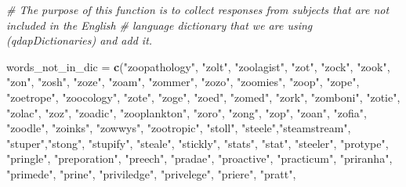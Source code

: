 \documentclass[
]{article}
\newenvironment{Shaded}{\begin{snugshade}}{\end{snugshade}}
\newcommand{\CommentTok}[1]{\textcolor[rgb]{0.56,0.35,0.01}{\textit{#1}}}
\newcommand{\FunctionTok}[1]{\textcolor[rgb]{0.13,0.29,0.53}{\textbf{#1}}}
\newcommand{\NormalTok}[1]{#1}
\newcommand{\OtherTok}[1]{\textcolor[rgb]{0.56,0.35,0.01}{#1}}
\newcommand{\StringTok}[1]{\textcolor[rgb]{0.31,0.60,0.02}{#1}}
\begin{document}
\begin{Shaded}
\begin{Highlighting}[]
\CommentTok{\# The purpose of this function is to collect responses from subjects that are not included in the English }
\CommentTok{\# language dictionary that we are using (qdapDictionaries) and add it. }

\NormalTok{words\_not\_in\_dic }\OtherTok{=} \FunctionTok{c}\NormalTok{(}\StringTok{"zoopathology"}\NormalTok{, }\StringTok{"zolt"}\NormalTok{, }\StringTok{"zoolagist"}\NormalTok{, }\StringTok{"zot"}\NormalTok{, }\StringTok{"zock"}\NormalTok{, }\StringTok{"zook"}\NormalTok{, }\StringTok{"zon"}\NormalTok{,}
                     \StringTok{"zosh"}\NormalTok{, }\StringTok{"zoze"}\NormalTok{, }\StringTok{"zoam"}\NormalTok{, }\StringTok{"zommer"}\NormalTok{, }\StringTok{"zozo"}\NormalTok{, }\StringTok{"zoomies"}\NormalTok{, }\StringTok{"zoop"}\NormalTok{, }\StringTok{"zope"}\NormalTok{,}
                     \StringTok{"zoetrope"}\NormalTok{, }\StringTok{"zoocology"}\NormalTok{, }\StringTok{"zote"}\NormalTok{, }\StringTok{"zoge"}\NormalTok{, }\StringTok{"zoed"}\NormalTok{, }\StringTok{"zomed"}\NormalTok{, }\StringTok{"zork"}\NormalTok{,}
                     \StringTok{"zomboni"}\NormalTok{, }\StringTok{"zotie"}\NormalTok{, }\StringTok{"zolac"}\NormalTok{, }\StringTok{"zoz"}\NormalTok{, }\StringTok{"zoadic"}\NormalTok{, }\StringTok{"zooplankton"}\NormalTok{, }\StringTok{"zoro"}\NormalTok{,}
                     \StringTok{"zong"}\NormalTok{, }\StringTok{"zop"}\NormalTok{, }\StringTok{"zoan"}\NormalTok{, }\StringTok{"zofia"}\NormalTok{, }\StringTok{"zoodle"}\NormalTok{, }\StringTok{"zoinks"}\NormalTok{, }\StringTok{"zowwys"}\NormalTok{,}
                     \StringTok{"zootropic"}\NormalTok{,}
                     \StringTok{"stoll"}\NormalTok{, }\StringTok{"steele"}\NormalTok{,}\StringTok{"steamstream"}\NormalTok{, }\StringTok{"stuper"}\NormalTok{,}\StringTok{"stong"}\NormalTok{, }\StringTok{"stupify"}\NormalTok{, }\StringTok{"steale"}\NormalTok{, }\StringTok{"stickly"}\NormalTok{,}
                     \StringTok{"stats"}\NormalTok{, }\StringTok{"stat"}\NormalTok{, }\StringTok{"steeler"}\NormalTok{,}
                     \StringTok{"protype"}\NormalTok{, }\StringTok{"pringle"}\NormalTok{, }\StringTok{"preporation"}\NormalTok{, }\StringTok{"preech"}\NormalTok{, }\StringTok{"pradae"}\NormalTok{, }\StringTok{"proactive"}\NormalTok{, }\StringTok{"practicum"}\NormalTok{,}
                     \StringTok{"priranha"}\NormalTok{, }\StringTok{"primede"}\NormalTok{, }\StringTok{"prine"}\NormalTok{, }\StringTok{"priviledge"}\NormalTok{, }\StringTok{"privelege"}\NormalTok{, }\StringTok{"priere"}\NormalTok{, }\StringTok{"pratt"}\NormalTok{,}

\end{Highlighting}
\end{Shaded}
\end{document}
